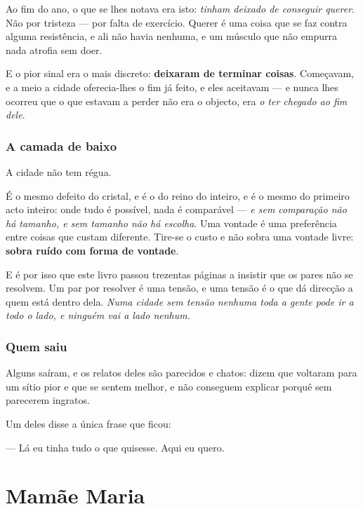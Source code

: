 \documentclass[livro.tex]{subfiles}
\begin{document}
\medskip

Ao fim do ano, o que se lhes notava era isto: \emph{tinham deixado de conseguir querer}. Não por
tristeza --- por falta de exercício. Querer é uma coisa que se faz contra alguma resistência, e
ali não havia nenhuma, e um músculo que não empurra nada atrofia sem doer.

\medskip

E o pior sinal era o mais discreto: \textbf{deixaram de terminar coisas}. Começavam, e a meio a
cidade oferecia-lhes o fim já feito, e eles aceitavam --- e nunca lhes ocorreu que o que estavam a
perder não era o objecto, era \emph{o ter chegado ao fim dele}.

\subsection*{A camada de baixo}

A cidade não tem régua.

\medskip

É o mesmo defeito do cristal, e é o do reino do inteiro, e é o mesmo do primeiro acto inteiro:
onde tudo é possível, nada é comparável --- \emph{e sem comparação não há tamanho, e sem tamanho
não há escolha}. Uma vontade é uma preferência entre coisas que custam diferente. Tire-se o custo
e não sobra uma vontade livre: \textbf{sobra ruído com forma de vontade}.

\medskip

E é por isso que este livro passou trezentas páginas a insistir que os pares não se resolvem. Um
par por resolver é uma tensão, e uma tensão é o que dá direcção a quem está dentro dela.
\emph{Numa cidade sem tensão nenhuma toda a gente pode ir a todo o lado, e ninguém vai a lado
nenhum.}

\subsection*{Quem saiu}

Alguns saíram, e os relatos deles são parecidos e chatos: dizem que voltaram para um sítio pior e
que se sentem melhor, e não conseguem explicar porquê sem parecerem ingratos.

\medskip

Um deles disse a única frase que ficou:

\medskip

--- Lá eu tinha tudo o que quisesse. Aqui eu quero.

\chapter{Mamãe Maria}
\end{document}
